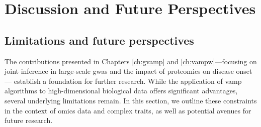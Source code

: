 \chapter{Discussion and Future Perspectives}
\label{ch:limitations_perspectives}

\section{Limitations and future perspectives}
\label{sec:limitations_perspectives}

The contributions presented in Chapters \ref{ch:gvamp} and \ref{ch:vampw}---focusing on joint inference in large-scale \gls{gwas} and the impact of proteomics on disease onset--- establish a foundation for further research. While the application of \acrlong{vamp} algorithms to high-dimensional biological data offers significant advantages, several underlying limitations remain. In this section, we outline these constraints in the context of omics data and complex traits, as well as potential avenues for future research.



